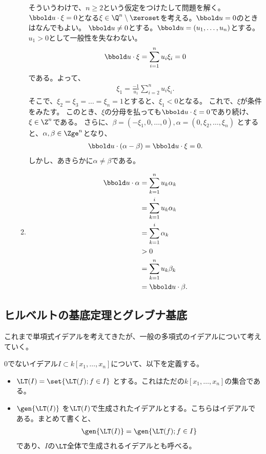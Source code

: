 \begin{enumerate}[label=(問題\arabic*)]
\begin{enumerate}[label=(\alph*)]
   そういうわけで、$n\ge 2$という仮定をつけたして問題を解く。$\bbold u\cdot \xi=0$となる$\xi \in \Q^n\setminus\zeroset$を考える。$\bbold u = 0$のときはなんでもよい。
   $\bbold u \neq 0$とする。$\bbold u = (u_1,\dots, u_n)$とする。$u_1 > 0$として一般性を失なわない。
   \begin{align}
     \bbold u\cdot \xi = \sum_{i=1}^n u_i \xi_i = 0
   \end{align}
   である。よって、
   \begin{align}
     \xi_1 = \frac{-1}{u_1}\sum_{i=2}^n u_i \xi_i.
   \end{align}
   そこで、$\xi_2=\xi_3=\dots = \xi_n = 1$とすると、$\xi_1 < 0$となる。
   これで、$\xi$が条件をみたす。
   このとき、$\xi$の分母を払っても$\bbold u\cdot \xi = 0$であり続け、
   $\xi \in \Z^n$である。
   さらに、$\beta = (-\xi_1,0,\dots,0),\alpha = (0,\xi_2,\dots,\xi_n)$
   とすると、$\alpha,\beta \in \Zge^n$となり、
   \begin{align}
     \bbold u\cdot (\alpha - \beta) = \bbold u\cdot \xi = 0.
   \end{align}
   しかし、あきらかに$\alpha \neq \beta$である。
   \item
   \begin{align}
     \bbold u \cdot \alpha
     &=
     \sum_{k=1}^n u_k \alpha_k\\
     &=
     \sum_{k=1}^i u_k \alpha_k\\
     &=
     \sum_{k=1}^i \alpha_k\\
     &>
     0\\
     &=
     \sum_{k=1}^n u_k \beta_k\\
     &=
     \bbold u\cdot \beta.
   \end{align}

 \end{enumerate}
\end{enumerate}

\subsection{ヒルベルトの基底定理とグレブナ基底}
\label{sub:ヒルベルトの基底定理とグレブナ基底}
これまで単項式イデアルを考えてきたが、一般の多項式のイデアルについて考えていく。

0でないイデアル$I\subset k[x_1,\dots,x_n]$について、以下を定義する。
\begin{itemize}
  \item  $\LT(I) = \set{\LT(f) ; f\in I}$ とする。これはただの$k[x_1,\dots,x_n]$の集合である。
  \item  $\gen{\LT(I)}$ を$\LT(I)$で生成されたイデアルとする。こちらはイデアルである。まとめて書くと、
  \begin{align}
    \gen{\LT(I)} = \gen{\LT(f) ; f\in I}
  \end{align}
  であり、$I$の$\LT$全体で生成されるイデアルとも呼べる。
\end{itemize}

